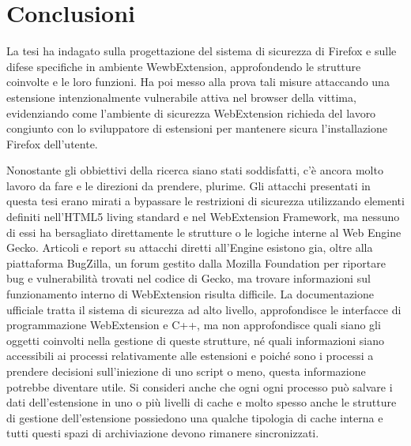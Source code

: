 \documentclass{sapthesis}
\begin{document}


\chapter{Conclusioni}
\label{cap:conclusioni}
    La tesi ha indagato sulla progettazione del sistema di sicurezza di Firefox e sulle difese
    specifiche in ambiente WewbExtension, approfondendo le strutture coinvolte e le loro funzioni.
    Ha poi messo alla prova tali misure attaccando una estensione intenzionalmente vulnerabile
    attiva nel browser della vittima, evidenziando come l'ambiente di sicurezza WebExtension richieda
    del lavoro congiunto con lo sviluppatore di estensioni per mantenere sicura l'installazione
    Firefox dell'utente.

    Nonostante gli obbiettivi della ricerca siano stati soddisfatti, c'è ancora molto lavoro da fare
    e le direzioni da prendere, plurime.
    Gli attacchi presentati in questa tesi erano mirati a bypassare le restrizioni di sicurezza
    utilizzando elementi definiti nell'HTML5 living standard e nel WebExtension Framework, ma 
    nessuno di essi ha bersagliato direttamente le strutture o le logiche interne al Web Engine Gecko.
    Articoli e report su attacchi diretti all'Engine esistono gia, oltre alla piattaforma BugZilla, un forum 
    gestito dalla Mozilla Foundation per riportare bug e vulnerabilità trovati nel codice di Gecko,
    ma trovare informazioni sul funzionamento interno di WebExtension risulta difficile.
    La documentazione ufficiale tratta il sistema di sicurezza ad alto livello, approfondisce le
    interfacce di programmazione WebExtension e C++, ma non approfondisce quali siano gli oggetti
    coinvolti nella gestione di queste strutture, né quali informazioni siano accessibili
    ai processi relativamente alle estensioni e poiché sono i processi a prendere decisioni
    sull'iniezione di uno script o meno, questa informazione potrebbe diventare utile. Si consideri
    anche che ogni ogni processo può salvare i dati dell'estensione in uno o più livelli di cache
    e molto spesso anche le strutture di gestione dell'estensione possiedono una qualche tipologia
    di cache interna e tutti questi spazi di archiviazione devono rimanere sincronizzati.
    
\end{document}
